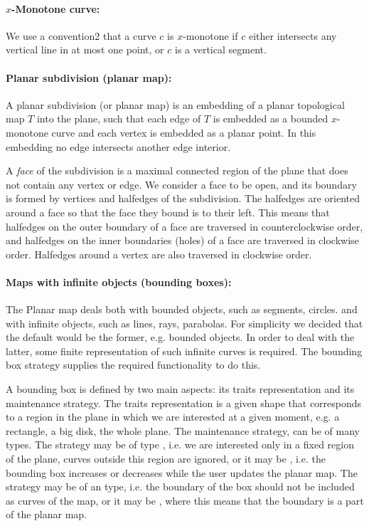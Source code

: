 \paragraph{$x$-Monotone curve:}
We
use a convention2
that a curve $c$ is $x$-monotone if $c$ either intersects 
any vertical line in at most one point, or $c$ is a vertical
segment. 

\paragraph{Planar subdivision (planar map):}
A planar subdivision (or planar map) is an embedding of a planar 
topological map $T$ 
into the plane, such that each edge of $T$ is embedded as a
bounded $x$-monotone curve and each vertex is embedded as a planar point.
In this embedding no
edge intersects another edge interior.

A {\em face} of the subdivision is a maximal connected region of the
plane that does not contain any vertex or edge. 
We consider a face to be open, and its boundary is
formed by vertices and halfedges of the subdivision.
The halfedges are oriented around a face so that the face they bound
is to their left. This means that halfedges on the outer boundary
of a face are traversed in counterclockwise order, and halfedges on the inner
boundaries (holes) of a face are traversed in clockwise order. Halfedges 
around a vertex are also traversed in clockwise order. 

\paragraph{Maps with infinite objects (bounding boxes):}

The Planar map deals both with bounded objects, such as segments, circles.
and with infinite objects, such as lines, rays, parabolas.
For simplicity we decided that the default would be the former, e.g. bounded objects.
In order to deal with the latter, some finite representation of such infinite curves is required. The bounding box strategy supplies the required functionality to do this.

A bounding box is defined by two main aspects: its traits representation and its maintenance strategy.
The traits representation is a given shape that corresponds to a region in the plane in which we are interested at a given moment, e.g. a rectangle, a big disk, the whole plane.
The maintenance strategy, can be of many types. The strategy may be of  type , i.e. we are interested only in a fixed region of the plane, curves outside this region are ignored, or it may be , i.e. the bounding box increases or decreases while the user updates the planar map.
The strategy may be of an  type, i.e. the boundary of the box should not be included as curves of the map, or it may be , where this means that the boundary is a part of the planar map.

